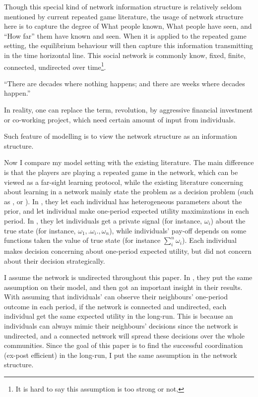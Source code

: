 \documentclass[12pt,letter]{article}
\theoremstyle{remark}
\theoremstyle{remark}
\theoremstyle{claim}
\begin{document}
   
 Though this special kind of network information structure is relatively seldom mentioned by current repeated game literature, the usage of network structure here is to capture the degree of What people known, What people have seen, and ``How far'' them have known and seen. When it is applied to the repeated game setting, the equilibrium behaviour will then capture this information transmitting in the time horizontal line. This social network is commonly know, fixed, finite, connected, undirected over time\footnote{It is hard to say this assumption is too strong or not,}.







“There are decades where nothing happens; and there are weeks where decades happen.” 




In reality, one can replace the term, revolution, by aggressive financial investment or co-working project, which need certain amount of input from individuals. 

Such feature of modelling is to view the network structure as an information structure.


Now I compare my model setting with the existing literature. The main difference is that the players are playing a repeated game in the network, which can be viewed as a far-sight learning protocol, while the existing literature concerning about learning in a network mainly state the problem as a decision problem (such as \cite{BG1998}, or \cite{GK2003}). In \cite{BG1998}, they let each individual has heterogeneous parameters about the prior, and let individual make one-period expected utility maximizations in each period. In \cite{GK2003}, they let individuals get a private signal (for instance, $\omega_i$) about the true state (for instance, $\omega_1,.\omega_i.,\omega_n$), while individuals' pay-off depends on some functions taken the value of true state (for instance $\sum^n_i\omega_i$). Each individual makes decision concerning about one-period expected utility, but did not concern about their decision strategically.  

I assume the network is undirected throughout this paper. In \cite{BG1998}, they put the same assumption on their model, and then got an important insight in their results. With assuming that individuals' can observe their neighbours' one-period outcome in each period, if the network is connected and undirected, each individual get the same expected utility in the long-run. This is because an individuals can always mimic their neighbours' decisions since the network is undirected, and a connected network will spread these decisions over the whole communities. Since the goal of this paper is to find the successful coordination (ex-post efficient) in the long-run, I put the same assumption in the network structure. 
\end{document}
